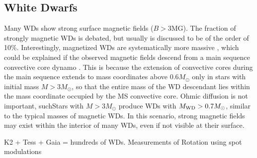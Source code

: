 {\color{red} \subsection{White Dwarfs}}
Many WDs show strong surface magnetic fields ($B>$3MG). The fraction of strongly magnetic WDs is debated, but usually is discussed to be of the order of 10\%. Interestingly, magnetized WDs are systematically more massive \cite{Ferrario_2015}, which could be explained if the observed magnetic fields descend from a main sequence convective core dynamo \cite{Cantiello_2016}. This is because the extension of convective cores during the main sequence extends to mass coordinates above 0.6$M_\odot$ only in stars with initial mass $M>3M_\odot$, so that the entire mass of the WD descendant lies within the mass coordinate occupied by the MS convective core. Ohmic diffusion is not important, suchStars with $M>3M_\odot$ produce WDs with $M_{\rm WD}>0.7M_\odot$, similar to the typical masses of magnetic WDs. In this scenario, strong magnetic fields may exist within the interior of many WDs, even if not visible at their surface. 

K2 + Tess + Gaia = hundreds of WDs. Measurements of Rotation using spot modulations